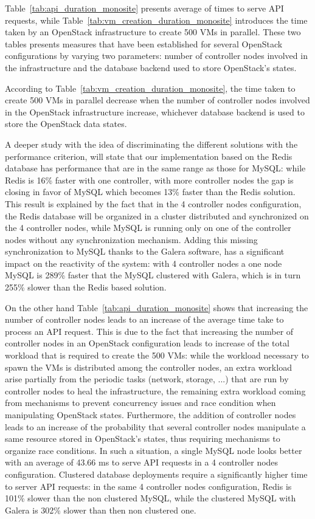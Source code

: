 Table~\ref{tab:api_duration_monosite} presents average of times to serve API
requests, while Table~\ref{tab:vm_creation_duration_monosite} introduces the
time taken by an OpenStack infrastructure to create 500 VMs in parallel. These
two tables presents measures that have been established for several OpenStack
configurations by varying two parameters: number of controller nodes involved in
the infrastructure and the database backend used to store OpenStack's states.


According to Table~\ref{tab:vm_creation_duration_monosite}, the time taken to
create 500 VMs in parallel decrease when the number of controller nodes involved
in the OpenStack infrastructure increase, whichever database backend is used to
store the OpenStack data states.

A deeper study with the idea of discriminating the different solutions with the
performance criterion, will state that our implementation based on the Redis
database has performance that are in the same range as those for MySQL: while
Redis is 16\% faster with one controller, with more controller nodes the gap is
closing in favor of MySQL which  becomes 13\% faster than the Redis solution.
This result is explained by the fact that in the 4 controller nodes
configuration, the Redis database will be organized in a cluster distributed and
synchronized on the 4 controller nodes, while MySQL is running only on one of
the controller nodes without any synchronization mechanism. Adding this missing
synchronization to MySQL thanks to the Galera software, has a significant impact
on the reactivity of the system: with 4 controller nodes a one node MySQL is
289\% faster that the MySQL clustered with Galera, which is in turn 255\% slower
than the Redis based solution.

On the other hand Table~\ref{tab:api_duration_monosite} shows that increasing
the number of controller nodes leads to an increase of the average time take to
process an API request. This is due to the fact that increasing the number of
controller nodes in an OpenStack configuration leads to increase of the total
workload that is required to create the 500 VMs: while the workload necessary to
spawn the VMs is distributed among the controller nodes, an extra workload arise
partially from the periodic tasks (network, storage, ...) that are run by
controller nodes to heal the infrastructure, the remaining extra workload coming
from mechanisms to prevent concurrency issues and race condition when
manipulating OpenStack states. Furthermore, the addition of controller nodes
leads to an increase of the probability that several controller nodes manipulate
a same resource stored in OpenStack's states, thus requiring mechanisms to
organize race conditions. In such a situation, a single MySQL node looks better
with an average of 43.66 ms to serve API requests in a 4 controller nodes
configuration. Clustered database deployments require a significantly higher
time to server API requests: in the same 4 controller nodes configuration, Redis
is 101\% slower than the non clustered MySQL, while the clustered MySQL with
Galera is 302\% slower than then non clustered one.


